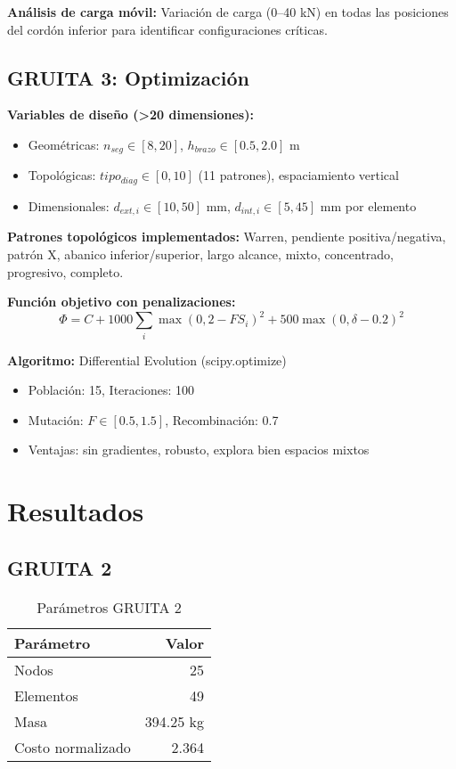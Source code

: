 \documentclass[10pt,a4paper]{article}
\begin{document}
\textbf{Análisis de carga móvil:} Variación de carga (0--40 kN) en todas las posiciones del cordón inferior para identificar configuraciones críticas.

\subsection{GRUITA 3: Optimización}

\textbf{Variables de diseño (>20 dimensiones):}
\begin{itemize}
\item Geométricas: $n_{seg} \in [8,20]$, $h_{brazo} \in [0.5,2.0]$ m
\item Topológicas: $tipo_{diag} \in [0,10]$ (11 patrones), espaciamiento vertical
\item Dimensionales: $d_{ext,i} \in [10,50]$ mm, $d_{int,i} \in [5,45]$ mm por elemento
\end{itemize}

\textbf{Patrones topológicos implementados:} Warren, pendiente positiva/negativa, patrón X, abanico inferior/superior, largo alcance, mixto, concentrado, progresivo, completo.

\textbf{Función objetivo con penalizaciones:}
\begin{equation}
\Phi = C + 1000\sum_{i} \max(0, 2-FS_i)^2 + 500\max(0, \delta-0.2)^2
\end{equation}

\textbf{Algoritmo:} Differential Evolution (scipy.optimize)
\begin{itemize}
\item Población: 15, Iteraciones: 100
\item Mutación: $F \in [0.5,1.5]$, Recombinación: 0.7
\item Ventajas: sin gradientes, robusto, explora bien espacios mixtos
\end{itemize}

\section{Resultados}

\subsection{GRUITA 2}

\begin{table}[H]
\small
\centering
\caption{Parámetros GRUITA 2}
\begin{tabular}{lr}
\toprule
\textbf{Parámetro} & \textbf{Valor} \\
\midrule
Nodos & 25 \\
Elementos & 49 \\
Masa & 394.25 kg \\
Costo normalizado & 2.364 \\
\bottomrule
\end{tabular}
\end{table}
\end{document}
